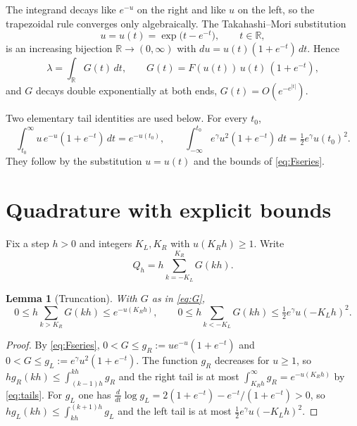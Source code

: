 \documentclass[11pt,a4paper]{article}
\newtheorem{lemma}{Lemma}
\theoremstyle{remark}
\newcommand{\lam}{\lambda}
\newcommand{\R}{\mathbb{R}}
\begin{document}
The integrand decays like $e^{-u}$ on the right and like $u$ on the
left, so the trapezoidal rule converges only algebraically. The
Takahashi--Mori substitution
\begin{equation}
  u=u(t)=\exp\bigl(t-e^{-t}\bigr),\qquad t\in\R,
  \label{eq:subst}
\end{equation}
is an increasing bijection $\R\to(0,\infty)$ with
$du=u(t)(1+e^{-t})\,dt$. Hence
\begin{equation}
  \lam=\int_{\R}G(t)\,dt,\qquad
  G(t)=F(u(t))\,u(t)\,(1+e^{-t}),
  \label{eq:G}
\end{equation}
and $G$ decays double exponentially at both ends,
$G(t)=O(e^{-e^{|t|}})$.

Two elementary tail identities are used below. For every $t_0$,
\begin{equation}
  \int_{t_0}^{\infty}u\,e^{-u}(1+e^{-t})\,dt=e^{-u(t_0)},\qquad
  \int_{-\infty}^{t_0}e^{\gamma}u^2(1+e^{-t})\,dt
  =\tfrac12 e^{\gamma}u(t_0)^2 .
  \label{eq:tails}
\end{equation}
They follow by the substitution $u=u(t)$ and the bounds of
\eqref{eq:Fseries}.

\section{Quadrature with explicit bounds}

Fix a step $h>0$ and integers $K_L,K_R$ with $u(K_Rh)\ge1$. Write
\begin{equation}
  Q_h=h\sum_{k=-K_L}^{K_R}G(kh).
\end{equation}

\begin{lemma}[Truncation]
\label{lem:tail}
With $G$ as in \eqref{eq:G},
\begin{equation}
  0\le h\!\!\sum_{k>K_R}\!G(kh)\le e^{-u(K_Rh)},\qquad
  0\le h\!\!\sum_{k<-K_L}\!G(kh)\le \tfrac12 e^{\gamma}u(-K_Lh)^2 .
\end{equation}
\end{lemma}

\begin{proof}
By \eqref{eq:Fseries}, $0<G\le g_R:=ue^{-u}(1+e^{-t})$ and
$0<G\le g_L:=e^\gamma u^2(1+e^{-t})$. The function $g_R$ decreases for
$u\ge1$, so $hg_R(kh)\le\int_{(k-1)h}^{kh}g_R$ and the right tail is at
most $\int_{K_Rh}^\infty g_R=e^{-u(K_Rh)}$ by \eqref{eq:tails}. For
$g_L$ one has $\frac{d}{dt}\log g_L=2(1+e^{-t})-e^{-t}/(1+e^{-t})>0$, so
$hg_L(kh)\le\int_{kh}^{(k+1)h}g_L$ and the left tail is at most
$\frac12e^\gamma u(-K_Lh)^2$.
\end{proof}
\end{document}
